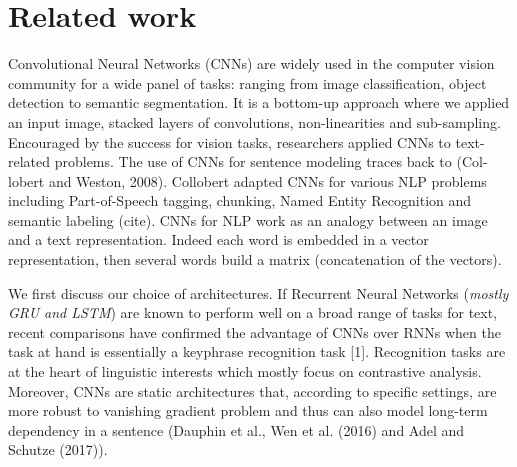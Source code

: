 \section{Related work}

Convolutional Neural Networks (CNNs) are widely used in the computer vision community for a wide panel of tasks: ranging from image classification, 
object detection to semantic segmentation. It is a bottom-up approach where we applied an input image, stacked layers of convolutions, non-linearities and sub-sampling.
Encouraged by the success for vision tasks, researchers applied CNNs to text-related problems. The use of CNNs for sentence modeling traces back to (Col-
lobert and Weston, 2008). Collobert adapted 
CNNs for various NLP problems including Part-of-Speech tagging, chunking, Named Entity Recognition and semantic labeling (cite). 
CNNs for NLP work as an analogy between an image and a text representation. Indeed each word is embedded in a vector representation, then several words build a matrix (concatenation of the vectors). 


We first discuss our choice of architectures. 
If Recurrent Neural Networks (\textit{mostly GRU and LSTM}) are known to perform well on a broad range of tasks for text, recent comparisons have confirmed the advantage of CNNs 
over RNNs when the task at hand is essentially a keyphrase recognition task [1]. Recognition tasks are at the heart of linguistic interests which mostly focus on contrastive analysis.
Moreover, CNNs are static architectures that, according to specific settings, are more robust 
to vanishing gradient problem and thus can also model long-term dependency in a sentence (Dauphin et al.,  
Wen et al. (2016) and Adel and Schutze (2017)). 

